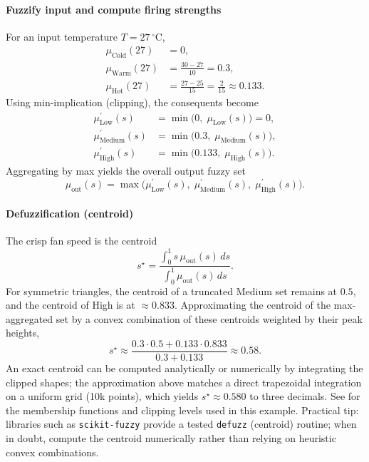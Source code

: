 \paragraph{Fuzzify input and compute firing strengths}
For an input temperature $T=27\,^{\circ}\!\mathrm{C}$,
\[
\begin{aligned}
\mu_{\text{Cold}}(27) &= 0,\\
\mu_{\text{Warm}}(27) &= \frac{30-27}{10}=0.3,\\
\mu_{\text{Hot}}(27)  &= \frac{27-25}{15}=\frac{2}{15}\approx 0.133.
\end{aligned}
\]
Using min-implication (clipping), the consequents become
\begin{align*}
    \mu^{'}_{\text{Low}}(s)    &= \min\big(0,\; \mu_{\text{Low}}(s)\big) = 0,\\
    \mu^{'}_{\text{Medium}}(s) &= \min\big(0.3,\; \mu_{\text{Medium}}(s)\big),\\
    \mu^{'}_{\text{High}}(s)   &= \min\big(0.133,\; \mu_{\text{High}}(s)\big).
\end{align*}
Aggregating by max yields the overall output fuzzy set
\[
    \mu_{\text{out}}(s) = \max\big(\mu^{'}_{\text{Low}}(s),\; \mu^{'}_{\text{Medium}}(s),\; \mu^{'}_{\text{High}}(s)\big).
\]

\paragraph{Defuzzification (centroid)}
The crisp fan speed is the centroid
\[
    s^{\star} = \frac{\int_0^1 s\, \mu_{\text{out}}(s)\, ds}{\int_0^1 \mu_{\text{out}}(s)\, ds}.
\]
For symmetric triangles, the centroid of a truncated Medium set remains at $0.5$, and the centroid of High is at $\approx 0.833$. Approximating the centroid of the max\hyp{}aggregated set by a convex combination of these centroids weighted by their peak heights,
\[
    s^{\star} \approx \frac{0.3\cdot 0.5 + 0.133\cdot 0.833}{0.3+0.133} \approx 0.58.
\]
An exact centroid can be computed analytically or numerically by integrating the clipped shapes; the approximation above matches a direct trapezoidal integration on a uniform grid (10k points), which yields $s^\star \approx 0.580$ to three decimals. See  for the membership functions and clipping levels used in this example.
Practical tip: libraries such as \texttt{scikit-fuzzy} provide a tested \texttt{defuzz} (centroid) routine; when in doubt, compute the centroid numerically rather than relying on heuristic convex combinations.

